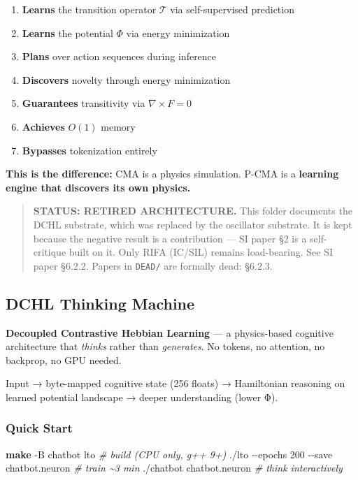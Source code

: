 \documentclass[
  11pt,
  a4paper,
]{article}
\newenvironment{Shaded}{\begin{snugshade}}{\end{snugshade}}
\newcommand{\AttributeTok}[1]{\textcolor[rgb]{0.13,0.29,0.53}{#1}}
\newcommand{\CommentTok}[1]{\textcolor[rgb]{0.56,0.35,0.01}{\textit{#1}}}
\newcommand{\ExtensionTok}[1]{#1}
\newcommand{\FunctionTok}[1]{\textcolor[rgb]{0.13,0.29,0.53}{\textbf{#1}}}
\newcommand{\NormalTok}[1]{#1}
\providecommand{\tightlist}{%
  \setlength{\itemsep}{0pt}\setlength{\parskip}{0pt}}
\begin{document}
\begin{enumerate}
\def\labelenumi{\arabic{enumi}.}
\tightlist
\item
  \textbf{Learns} the transition operator \(\mathcal{T}\) via
  self-supervised prediction
\item
  \textbf{Learns} the potential \(\Phi\) via energy minimization
\item
  \textbf{Plans} over action sequences during inference
\item
  \textbf{Discovers} novelty through energy minimization
\item
  \textbf{Guarantees} transitivity via \(\nabla \times F = 0\)
\item
  \textbf{Achieves} \(O(1)\) memory
\item
  \textbf{Bypasses} tokenization entirely
\end{enumerate}

\textbf{This is the difference:} CMA is a physics simulation. P-CMA is a
\textbf{learning engine that discovers its own physics.}

\newpage

\begin{quote}
\textbf{STATUS: RETIRED ARCHITECTURE.} This folder documents the DCHL
substrate, which was replaced by the oscillator substrate. It is kept
because the negative result is a contribution --- SI paper §2 is a
self-critique built on it. Only RIFA (IC/SIL) remains load-bearing. See
SI paper §6.2.2. Papers in \texttt{DEAD/} are formally dead: §6.2.3.
\end{quote}

\subsection{DCHL Thinking Machine}\label{dchl-thinking-machine}

\textbf{Decoupled Contrastive Hebbian Learning} --- a physics-based
cognitive architecture that \emph{thinks} rather than \emph{generates}.
No tokens, no attention, no backprop, no GPU needed.

Input → byte-mapped cognitive state (256 floats) → Hamiltonian reasoning
on learned potential landscape → deeper understanding (lower Φ).

\subsubsection{Quick Start}\label{quick-start}

\begin{Shaded}
\begin{Highlighting}[]
\FunctionTok{make} \AttributeTok{{-}B}\NormalTok{ chatbot lto      }\CommentTok{\# build (CPU only, g++ 9+)}
\ExtensionTok{./lto} \AttributeTok{{-}{-}epochs}\NormalTok{ 200 }\AttributeTok{{-}{-}save}\NormalTok{ chatbot.neuron  }\CommentTok{\# train \textasciitilde{}3 min}
\ExtensionTok{./chatbot}\NormalTok{ chatbot.neuron                    }\CommentTok{\# think interactively}
\end{Highlighting}
\end{Shaded}
\end{document}
